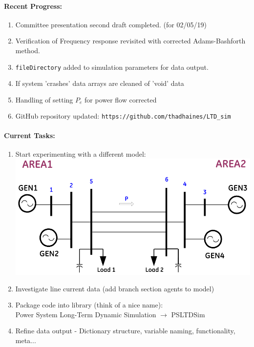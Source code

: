 \documentclass[12pt]{article}
\begin{document}
	\paragraph{Recent Progress:}
	\begin{enumerate}
		\item Committee presentation second draft completed. (for 02/05/19)
		\item Verification of Frequency response revisited with corrected Adams-Bashforth method.
		
		\item \verb|fileDirectory| added to simulation parameters for data output.
		
		\item If system 'crashes' data arrays are cleaned of 'void' data
		
		\item Handling of setting $P_e$ for power flow corrected
		
		\item GitHub repository updated:
		\subitem \verb|https://github.com/thadhaines/LTD_sim|
		
	\end{enumerate}
\paragraph{Current Tasks:}
	\begin{enumerate}
		\item Start experimenting with a different model:\\
		\includegraphics[width=\linewidth]{g4aSys}
		\item Investigate line current data (add branch section agents to model)
		\item Package code into library (think of a nice name):\\
		Power System Long-Term Dynamic Simulation $\rightarrow$ PSLTDSim
		\item Refine data output - Dictionary structure, variable naming, functionality, meta...
	\end{enumerate}
\pagebreak
\end{document}
